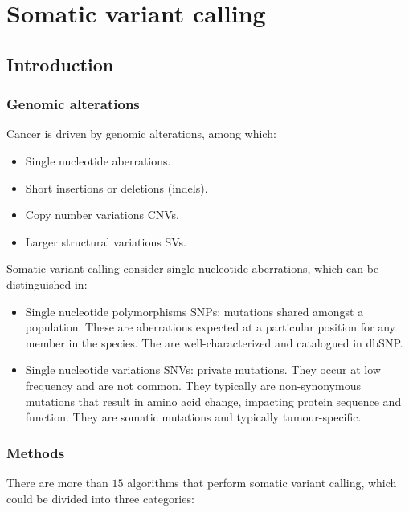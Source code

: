 \graphicspath{{chapters/laboratory/06/images}}
\chapter{Somatic variant calling}

\section{Introduction}

	\subsection{Genomic alterations}
	Cancer is driven by genomic alterations, among which:

	\begin{multicols}{2}
		\begin{itemize}
			\item Single nucleotide aberrations.
			\item Short insertions or deletions (indels).
			\item Copy number variations CNVs.
			\item Larger structural variations SVs.
		\end{itemize}
	\end{multicols}

	Somatic variant calling consider single nucleotide aberrations, which can be distinguished in:

	\begin{multicols}{2}
		\begin{itemize}
			\item Single nucleotide polymorphisms SNPs: mutations shared amongst a population.
				These are aberrations expected at a particular position for any member in the species.
				The are well-characterized and catalogued in dbSNP.
			\item Single nucleotide variations SNVs: private mutations.
				They occur at low frequency and are not common.
				They typically are non-synonymous mutations that result in amino acid change, impacting protein sequence and function.
				They are somatic mutations and typically tumour-specific.
		\end{itemize}
	\end{multicols}

	\subsection{Methods}
	There are more than $15$ algorithms that perform somatic variant calling, which could be divided into three categories:

